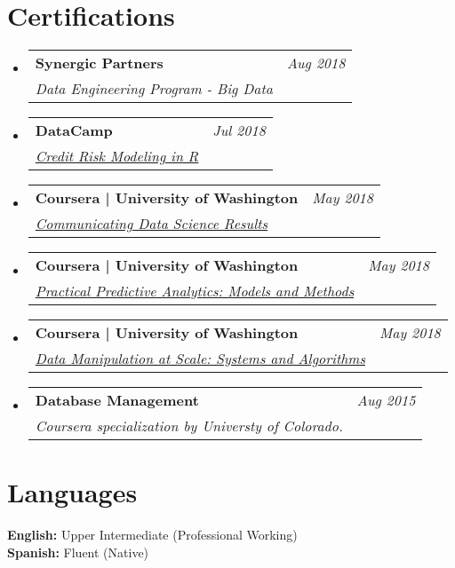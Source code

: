 \documentclass[letterpaper,11pt]{article}
\makeatletter
\newcommand{\resumeCertificationHeading}[4]{
  \vspace{-2pt}\item
  \begin{tabular*}{0.97\textwidth}[t]{l@{\extracolsep{\fill}}r}
    \textbf{#1} & \textit{\small #2} \\
    \textit{\small#3}
  \end{tabular*}\vspace{-7pt}
}
\newcommand{\resumeSubHeadingListStart}{\begin{itemize}[leftmargin=0.15in, label={}]}
\newcommand{\resumeSubHeadingListEnd}{\end{itemize}}
\makeatother
\begin{document}
\section*{Certifications}
    \vspace{3pt}
    \resumeSubHeadingListStart
        \resumeCertificationHeading
        {Synergic Partners}{Aug 2018}{Data Engineering Program - Big Data} \\ \vspace{3pt}
        \resumeCertificationHeading
        {DataCamp}{Jul 2018}{\href{https://www.datacamp.com/statement-of-accomplishment/course/570aea98df0efb32a187e8827252a6e45461ef1f}{Credit Risk Modeling in R}} \\ \vspace{3pt}
        \resumeCertificationHeading
        {Coursera | University of Washington}{May 2018}{\href{https://www.coursera.org/account/accomplishments/verify/Q6FA9BCRNPDD}{Communicating Data Science Results}} \\ \vspace{3pt}
        \resumeCertificationHeading
        {Coursera | University of Washington}{May 2018}{\href{https://www.coursera.org/account/accomplishments/verify/AWPU7U793JRS}{Practical Predictive Analytics: Models and Methods}} \\ \vspace{3pt}
        \resumeCertificationHeading
        {Coursera | University of Washington}{May 2018}{\href{https://www.coursera.org/account/accomplishments/verify/QRZJQH9JU9XW}{Data Manipulation at Scale: Systems and Algorithms}} \\ \vspace{3pt}
        \resumeCertificationHeading
        {Database Management}{Aug 2015}{Coursera specialization by Universty of Colorado.} \\ \vspace{3pt}
    \resumeSubHeadingListEnd

\section*{Languages}
    \vspace{3pt}
    \resumeSubHeadingListStart
        \small{\item{
            \textbf{English:}{ Upper Intermediate (Professional Working)} \\ \vspace{3pt}
            \textbf{Spanish:}{ Fluent (Native)} \\ \vspace{3pt}
        }}
    \resumeSubHeadingListEnd
\end{document}
